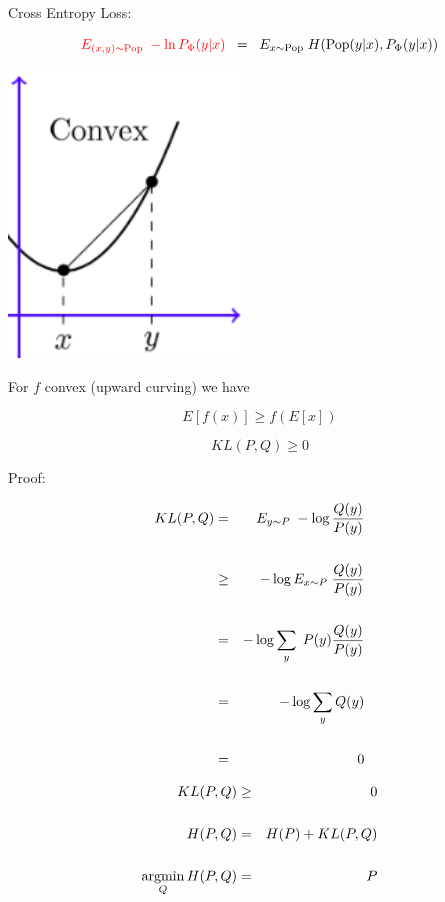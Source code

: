{\vfill
Cross Entropy Loss:

$${\color{red} E_{(x,y)\sim \mathrm{Pop}}\;-\ln P_\Phi(y|x)}\;\; = \;\; E_{x \sim \mathrm{Pop}}\;H(\mathrm{Pop}(y|x),P_\Phi(y|x))$$


\centerline{\includegraphics[height = 3.0in]{../images/Jensen}}

\vfill
For $f$ convex (upward curving) we have

\vfill
$$E[f(x)] \geq f(E[x])$$


$$KL(P,Q) \geq 0$$

\vfill
Proof:

\begin{eqnarray*}
  KL(P,Q) & = & E_{y \sim P}\;- \log \frac{Q(y)}{P(y)} \\
  \\
  & \geq & - \log E_{x\sim P}\;\frac{Q(y)}{P(y)} \\
  \\
  & = & - \log \sum_y\; P(y) \frac{Q(y)}{P(y)}  \\
  \\
  & = & - \log \sum_y Q(y) \\
  \\
  & = & 0
\end{eqnarray*}


\begin{eqnarray*}
  KL(P,Q) & \geq & 0 \\
  \\
  H(P,Q) & = & H(P) + KL(P,Q) \\
  \\
  \operatorname*{argmin}_Q H(P,Q) & = & P
\end{eqnarray*}

}
